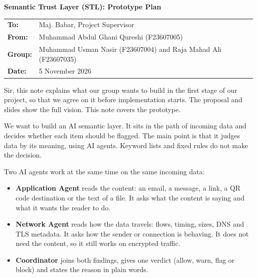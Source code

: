 \documentclass[10.5pt,a4paper]{article}
\newcommand{\head}[1]{\vspace{5pt}{\large\bfseries #1}\par\vspace{1pt}}
\begin{document}
{\LARGE\bfseries Semantic Trust Layer (STL): Prototype Plan}\par
\vspace{4pt}
\begin{tabular}{@{}ll@{}}
\textbf{To:} & Maj. Babar, Project Supervisor \\
\textbf{From:} & Muhammad Abdul Ghani Qureshi (F23607005) \\
\textbf{Group:} & Muhammad Usman Nasir (F23607004) and Raja Mahad Ali (F23607035) \\
\textbf{Date:} & 5 November 2026 \\
\end{tabular}

\vspace{4pt}
Sir, this note explains what our group wants to build in the first stage of our project, so that we agree on it before implementation starts. The proposal and slides show the full vision. This note covers the prototype.

\head{1. What we want to build}
We want to build an AI semantic layer. It sits in the path of incoming data and decides whether each item should be flagged. The main point is that it judges data by its meaning, using AI agents. Keyword lists and fixed rules do not make the decision.

Two AI agents work at the same time on the same incoming data:

\begin{itemize}
  \item \textbf{Application Agent} reads the content: an email, a message, a link, a QR code destination or the text of a file. It asks what the content is saying and what it wants the reader to do.
  \item \textbf{Network Agent} reads how the data travels: flows, timing, sizes, DNS and TLS metadata. It asks how the sender or connection is behaving. It does not need the content, so it still works on encrypted traffic.
  \item \textbf{Coordinator} joins both findings, gives one verdict (allow, warn, flag or block) and states the reason in plain words.
\end{itemize}
\end{document}
